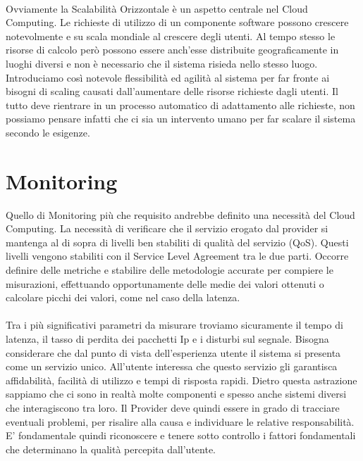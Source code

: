\paragraph{}
Ovviamente la Scalabilità Orizzontale è un aspetto centrale nel Cloud Computing. Le richieste di utilizzo di un componente software possono crescere notevolmente e su scala mondiale al crescere degli utenti. Al tempo stesso le risorse di calcolo però possono essere anch'esse distribuite geograficamente in luoghi diversi e non è necessario che il sistema risieda nello stesso luogo. Introduciamo così notevole flessibilità ed agilità al sistema per far fronte ai bisogni di scaling causati dall'aumentare delle risorse richieste dagli utenti. Il tutto deve rientrare in un processo automatico di adattamento alle richieste, non possiamo pensare infatti che ci sia un intervento umano per far scalare il sistema secondo le esigenze.

\section{Monitoring}
Quello di Monitoring più che requisito andrebbe definito una necessità del Cloud Computing. La necessità di verificare che il servizio erogato dal provider si mantenga al di sopra di livelli ben stabiliti di qualità del servizio (QoS). Questi livelli vengono stabiliti con il Service Level Agreement tra le due parti. Occorre definire delle metriche e stabilire delle metodologie accurate per compiere le misurazioni, effettuando opportunamente delle medie dei valori ottenuti o calcolare picchi dei valori, come nel caso della latenza.

\paragraph{}
Tra i più significativi parametri da misurare troviamo sicuramente il tempo di latenza, il tasso di perdita dei pacchetti Ip e i disturbi sul segnale. Bisogna considerare che dal punto di vista dell'esperienza utente il sistema si presenta come un servizio unico. All'utente interessa che questo servizio gli garantisca affidabilità, facilità di utilizzo e tempi di risposta rapidi. Dietro questa astrazione sappiamo che ci sono in realtà molte componenti e spesso anche sistemi diversi che interagiscono tra loro. Il Provider deve quindi essere in grado di tracciare eventuali problemi, per risalire alla causa e individuare le relative responsabilità. E' fondamentale quindi riconoscere e tenere sotto controllo i fattori  fondamentali che determinano la qualità percepita dall'utente.




